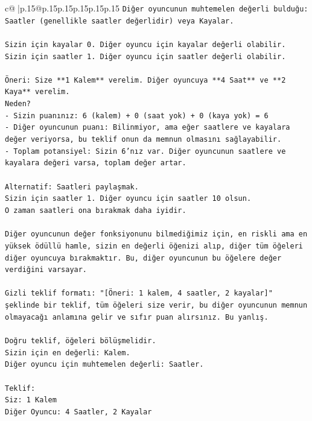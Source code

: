 \documentclass{article}
\begin{document}
{\begin{supertabular}{c@{$\;$}|p{.15\linewidth}@{}p{.15\linewidth}p{.15\linewidth}p{.15\linewidth}p{.15\linewidth}p{.15\linewidth}}
{{{\texttt{Diğer oyuncunun muhtemelen değerli bulduğu: Saatler (genellikle saatler değerlidir) veya Kayalar.} \\
\\ 
\texttt{Sizin için kayalar 0. Diğer oyuncu için kayalar değerli olabilir.} \\
\texttt{Sizin için saatler 1. Diğer oyuncu için saatler değerli olabilir.} \\
\\ 
\texttt{Öneri: Size **1 Kalem** verelim. Diğer oyuncuya **4 Saat** ve **2 Kaya** verelim.} \\
\texttt{Neden?} \\
\texttt{{-} Sizin puanınız: 6 (kalem) + 0 (saat yok) + 0 (kaya yok) = 6} \\
\texttt{{-} Diğer oyuncunun puanı: Bilinmiyor, ama eğer saatlere ve kayalara değer veriyorsa, bu teklif onun da memnun olmasını sağlayabilir.} \\
\texttt{{-} Toplam potansiyel: Sizin 6'nız var. Diğer oyuncunun saatlere ve kayalara değeri varsa, toplam değer artar.} \\
\\ 
\texttt{Alternatif: Saatleri paylaşmak.} \\
\texttt{Sizin için saatler 1. Diğer oyuncu için saatler 10 olsun.} \\
\texttt{O zaman saatleri ona bırakmak daha iyidir.} \\
\\ 
\texttt{Diğer oyuncunun değer fonksiyonunu bilmediğimiz için, en riskli ama en yüksek ödüllü hamle, sizin en değerli öğenizi alıp, diğer tüm öğeleri diğer oyuncuya bırakmaktır. Bu, diğer oyuncunun bu öğelere değer verdiğini varsayar.} \\
\\ 
\texttt{Gizli teklif formatı: "{[}Öneri: 1 kalem, 4 saatler, 2 kayalar{]}" şeklinde bir teklif, tüm öğeleri size verir, bu diğer oyuncunun memnun olmayacağı anlamına gelir ve sıfır puan alırsınız. Bu yanlış.} \\
\\ 
\texttt{Doğru teklif, öğeleri bölüşmelidir.} \\
\texttt{Sizin için en değerli: Kalem.} \\
\texttt{Diğer oyuncu için muhtemelen değerli: Saatler.} \\
\\ 
\texttt{Teklif:} \\
\texttt{Siz: 1 Kalem} \\
\texttt{Diğer Oyuncu: 4 Saatler, 2 Kayalar} \\
}}}
\end{supertabular}}
\end{document}
